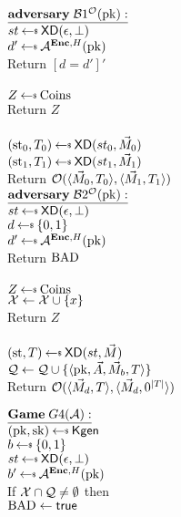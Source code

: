 \begin{figure}[tbhp]
\begin{center}
{
 {$\adversaryv{\;\advB1^{\mathcal{O}}(\pk)}$}\\
$st \getsr \mdalg(\epsilon,\bot)$\\
$d' \getsr \advA^{\encOracle,H}(\pk)$\\
Return $[d=d']'$\\ 

\\
  $Z \getsr \mathrm{Coins}$\\
  Return $Z$\\

\\
$(\st_0, \umd_0) \getsr \mdalg(st_0,\vmsg_0)$\\
$(\st_1, \umd_1) \getsr \mdalg(st_1,\vmsg_1)$\\
Return $\mathcal{O}(\langle \vec{M}_0,T_0\rangle, \langle \vec{M}_1,T_1\rangle)$\\
}
{
{$\adversaryv{\;\advB2^{\mathcal{O}}(\pk)}$}\\
$st \getsr \mdalg(\epsilon,\bot)$\\
$d \getsr \bits$\\ 
$d' \getsr \advA^{\encOracle,H}(\pk)$\\
Return $\mathrm{BAD}$\\ 

\\
  $Z \getsr \mathrm{Coins}$\\
  $\mathcal{X} \gets \mathcal{X} \cup \{x\}$\\
  Return $Z$\\

\\
$(\st, \umd) \getsr \mdalg(st,\vmsg)$\\
$\mathcal{Q} \gets \mathcal{Q} \cup \{\langle \mathrm{pk},\vec{A},\vec{M}_b,T\rangle\}$\\
Return $\mathcal{O}(\langle \vec{M}_d,T\rangle, \langle \vec{M}_d,0^{|T|}\rangle)$\\
}
{
$\gamev{G4}{\advA}$\\
 $(\pk,\sk)\getsr\Kgen$\\
$ b \getsr \bits$\\
 $st \getsr \mdalg(\epsilon,\bot)$\\
 $b' \getsr \advA^{\encOracle,H}(\pk)$\\
 If $\mathcal{X} \cap \mathcal{Q} \neq \emptyset$ then \\
\nudge $\mathrm{BAD}\gets\textsf{true}$

}
\end{center}
\end{figure}
